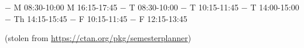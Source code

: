 \documentclass[a4paper, 12pt]{scrartcl}
\begin{document}


\newlength{\timetableWidthI}
\settowidth{\timetableWidthI}{12:30}
\addtolength{\timetableWidthI}{2em}

\newlength{\timetableWidthII}
\setlength{\timetableWidthII}{-\timetableWidthI}
\addtolength{\timetableWidthII}{1.2\textwidth}

\begin{timetable}[days={Mon,Thue,Wend,Thur,Fri}, end time/.evaluated={21*60}, length=15, width=\timetableWidthII]
	 {−}    {\zoom}  {M}  {08:30-10:00} {\phigh}      {}
	             {\tbd} {\teams} {M}  {16:15-17:45} {\pmid}       {}
	 {−}    {\zoom}  {T}  {08:30-10:00} {\phigh}      {}
	             {−}    {\teams} {T}  {10:15-11:45} {\pmid}       {}
	         {−}    {\teams} {T}  {14:00-15:00} {\phigh}      {}
	             {−}    {\teams} {Th} {14:15-15:45} {\pmid}       {}
	                 {−}    {\teams} {F}  {10:15-11:45} {}            {}
	      {−}    {\zoom}  {F}  {12:15-13:45} {\pmandatory} {}
\end{timetable}
(stolen from \url{https://ctan.org/pkg/semesterplanner})
\end{document}
